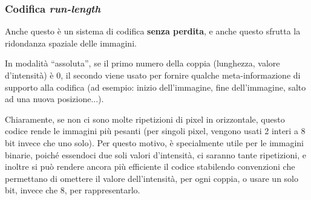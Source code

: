 \documentclass[a4paper,11pt]{article}
\begin{document}
\subsubsection{Codifica \textit{run-length}}
Anche questo è un sistema di codifica \textbf{senza perdita}, e anche questo sfrutta la ridondanza spaziale delle immagini.
\par
In modalità ``assoluta'', se il primo numero della coppia (lunghezza, valore d'intensità) è 0, il secondo viene usato per fornire qualche meta-informazione di supporto alla codifica
(ad esempio: inizio dell'immagine, fine dell'immagine, salto ad una nuova posizione...).
\par
Chiaramente, se non ci sono molte ripetizioni di pixel in orizzontale, questo codice rende le immagini più pesanti (per singoli pixel, vengono usati 2 interi a 8 bit invece che uno solo).
Per questo motivo, è specialmente utile per le immagini binarie, poiché essendoci due soli valori d'intensità, ci saranno tante ripetizioni, e inoltre si può rendere ancora più efficiente il codice
stabilendo convenzioni che permettano di omettere il valore dell'intensità, per ogni coppia, o usare un solo bit, invece che 8, per rappresentarlo.
\end{document}
